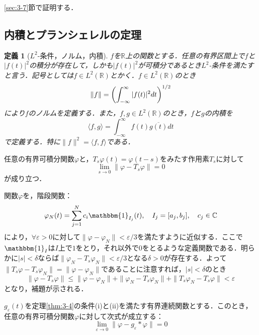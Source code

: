 \documentclass[dvipdfmx,a4j,10pt]{jsarticle}
\makeatletter
\theoremstyle{mystyle1}
\theoremstyle{mystyle3}
\theoremstyle{mystyle4}
\theoremstyle{mystyle6}
\newtheorem{definition}{定義}[section]
\theoremstyle{mystyle2}
\theoremstyle{mystyle5}
\newtheorem{theorem*}{定理}
\newtheorem{lemma*}{補題}
\renewenvironment{proof}[1][\proofname]{\par
  \pushQED{\qed}%
  \normalfont
  \topsep6\p@\@plus6\p@ \trivlist
  \item[\hskip\labelsep{\bfseries\sffamily #1}]\ignorespaces
}{%
  \popQED\endtrivlist\@endpefalse
}
\renewcommand\proofname{証明}
\newenvironment{dfn}[1][]
{\begin{tcolorbox}[
    enhanced,
    boxrule=0pt,
    arc=0mm,
    frame hidden,
    borderline west={2pt}{-4pt}{green!60!black},
    breakable = true
    ]
    \begin{definition}[#1]
}
{\end{definition}\end{tcolorbox}}
\newenvironment{thm*}[1][]
{\begin{tcolorbox}[
    enhanced,
    boxrule=0pt,
    arc=0mm,
    frame hidden,
    borderline west={2pt}{-4pt}{red},
    breakable = true
    ]
    \begin{theorem*}[#1]
}
{\end{theorem*}\end{tcolorbox}}
\newenvironment{lem*}[1][]
{\begin{tcolorbox}[
    enhanced,
    boxrule=0pt,
    arc=0mm,
    frame hidden,
    borderline west={2pt}{-4pt}{yellow!90!black},
    breakable = true
    ]
    \begin{lemma*}[#1]
}
{\end{lemma*}\end{tcolorbox}}
\makeatother
\begin{document}
\begin{proof}
	\ref{sec:3-7}節で証明する．
\end{proof}

\subsection{内積とプランシェレルの定理}

\begin{dfn}[$L^2$-条件，ノルム，内積]
	$f$を$\mathbb{R}$上の関数とする．任意の有界区間上で$f$と$|f(t)|^2$の積分が存在して，しかも$|f(t)|^2$が可積分であるとき$L^2$-条件を満たすと言う．記号としては$f\in L^2(\mathbb{R})$とかく．$f\in L^2(\mathbb{R})$のとき
	\[
		\|f\|=\mleft(\int_{-\infty}^\infty |f(t)|^2dt\mright)^{1/2}
	\]
	により$f$のノルムを定義する．また，$f,g\in L^2(\mathbb{R})$のとき，$f$と$g$の内積を
	\[
		\langle f,g \rangle=\int_{-\infty}^\infty f(t)\overline{g(t)}dt
	\]
	で定義する．特に$\|f\|^2=\langle f,f \rangle$である．
\end{dfn}

\begin{lem*}
	任意の有界可積分関数$\varphi$と，$T_s\varphi(t)=\varphi(t-s)$をみたす作用素$T_s$に対して
	\[
		\lim_{s\to 0}\|\varphi -T_s\varphi\|=0
	\]
	が成り立つ．
\end{lem*}

\begin{proof}
	関数$\varphi$を，階段関数：
	\[
		\varphi_N(t)=\sum_{j=1}^N c_i\mathbbm{1}_{I_j}(t),\quad I_j=[a_j,b_j],\quad c_j\in\mathbb{C}
	\]
	により，$\forall\varepsilon>0$に対して$\|\varphi-\varphi_N\|<\varepsilon/3$を満たすように近似する．ここで$\mathbbm{1}_I$は$I$上で$1$をとり，それ以外で$0$をとるような定義関数である．明らかに$|s|<\delta$ならば$\|\varphi_N-T_s\varphi_N\|<\varepsilon/3$となる$\delta>0$が存在する．よって$\|T_s\varphi-T_s\varphi_N\|=\|\varphi-\varphi_N\|$であることに注意すれば，$|s|<\delta$のとき
	\[
		\|\varphi-T_s\varphi\|\leq\|\varphi-\varphi_N\|+\|\varphi_N-T_s\varphi_N\|+\|T_s\varphi_N-T_s\varphi\|<\varepsilon
	\]
	となり，補題が示される．
\end{proof}

\begin{thm*}
	$g_\varepsilon(t)$を定理\ref{thm:3-4}の条件(i)と(ii)を満たす有界連続関数とする．このとき，任意の有界可積分関数$\varphi$に対して次式が成立する：
	\[
		\lim_{\varepsilon\to 0}\|\varphi-g_\varepsilon*\varphi\|=0
	\]
\end{thm*}
\end{document}
